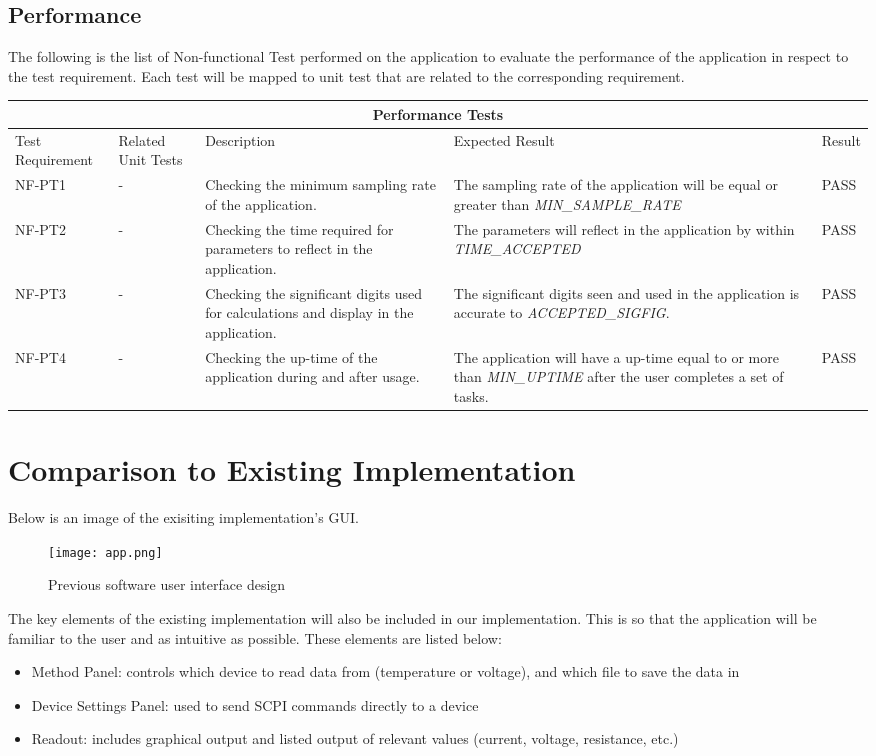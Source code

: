 \documentclass[12pt, titlepage]{article}
\begin{document}
\subsection{Performance}
The following is the list of Non-functional Test performed on the application to evaluate the performance of the application in respect to the test requirement. Each test will be mapped to unit test that are related to the corresponding requirement.\\
\begin{tabular}{ |p{2.3cm}||p{2cm}|p{3cm}|p{4cm}|p{2cm}| }
  \hline
  \multicolumn{5}{|c|}{Performance Tests} \\
  \hline
  Test Requirement & Related Unit Tests & Description & Expected Result & Result\\
  \hline
  NF-PT1   & - & Checking the minimum sampling rate of the application.  & The sampling rate of the application will be equal or greater than \textsl{MIN\_SAMPLE\_RATE} & PASS\\
  \hline
  NF-PT2   & - & Checking the time required for parameters to reflect in the application.  & The parameters will reflect in the application by within \textsl{TIME\_ACCEPTED} & PASS\\
  \hline
  NF-PT3   & - & Checking the significant digits used for calculations and display in the application.  &  The significant digits seen and used in the application is accurate to \textsl{ACCEPTED\_SIGFIG}. & PASS\\
  \hline
  NF-PT4   & - & Checking the up-time of the application during and after usage.  &  The application will have a up-time equal to or more than \textsl{MIN\_UPTIME} after the user completes a set of tasks. & PASS\\
  \hline
 \end{tabular}

	
 \pagebreak
\section{Comparison to Existing Implementation}	

\noindent Below is an image of the exisiting implementation's GUI.

\begin{figure}[H]
\centerline{\texttt{[image: app.png]}}
\caption{Previous software user interface design}
\label{fig}
\end{figure}

\noindent The key elements of the existing implementation will also be included in our implementation. This is so that the application will be familiar to the user and as intuitive as possible. These elements are listed below:
\begin{itemize}
  \item Method Panel: controls which device to read data from (temperature or voltage), and which file to save the data in
  \item Device Settings Panel: used to send SCPI commands directly to a device
  \item Readout: includes graphical output and listed output of relevant values (current, voltage, resistance, etc.)
\end{itemize}
\end{document}
